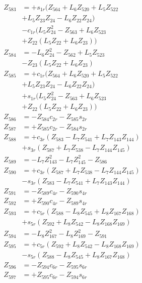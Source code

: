 \begin{multicols}{2}
\begin{align}
Z_{583} &= + s_{1r}(Z_{564} + L_6Z_{520} + L_5Z_{522}  \nonumber \\
&+ L_5Z_{23}Z_{24} - L_6Z_{22}Z_{24})  \nonumber \\
&- c_{1r}(L_5Z_{24}^2 - Z_{563} + L_6Z_{523}  \nonumber \\
&+ Z_{22}(L_5Z_{22} + L_6Z_{23})) \nonumber \\
Z_{584} &= - L_6Z_{24}^2 - Z_{562} + L_5Z_{523}  \nonumber \\
&- Z_{23}(L_5Z_{22} + L_6Z_{23})  \nonumber \\
Z_{585} &= + c_{1r}(Z_{564} + L_6Z_{520} + L_5Z_{522}  \nonumber \\
&+ L_5Z_{23}Z_{24} - L_6Z_{22}Z_{24})  \nonumber \\
&+ s_{1r}(L_5Z_{24}^2 - Z_{563} + L_6Z_{523}  \nonumber \\
&+ Z_{22}(L_5Z_{22} + L_6Z_{23})) \nonumber \\
Z_{586} &=  - Z_{584}c_{2r} - Z_{585}s_{2r} \nonumber \\
Z_{587} &=  + Z_{585}c_{2r} - Z_{584}s_{2r} \nonumber \\
Z_{588} &= + c_{3r}(Z_{583} - L_7Z_{541} + L_7Z_{143}Z_{144})  \nonumber \\
&+ s_{3r}(Z_{587} + L_7Z_{538} - L_7Z_{144}Z_{145}) \nonumber \\
Z_{589} &= - L_7Z_{143}^2 - L_7Z_{145}^2 - Z_{586}  \nonumber \\
Z_{590} &=  + c_{3r}(Z_{587} + L_7Z_{538} - L_7Z_{144}Z_{145})  \nonumber \\
&- s_{3r}(Z_{583} - L_7Z_{541} + L_7Z_{143}Z_{144}) \nonumber \\
Z_{591} &= - Z_{589}c_{4r} - Z_{590}s_{4r} \nonumber \\
Z_{592} &= + Z_{590}c_{4r} - Z_{589}s_{4r} \nonumber \\
Z_{593} &= + c_{5r}(Z_{588} - L_8Z_{545} + L_8Z_{167}Z_{168})  \nonumber \\
&+ s_{5r}(Z_{592} + L_8Z_{542} - L_8Z_{168}Z_{169}) \nonumber \\
Z_{594} &= - L_8Z_{167}^2 - L_8Z_{169}^2 - Z_{591}  \nonumber \\
Z_{595} &=  + c_{5r}(Z_{592} + L_8Z_{542} - L_8Z_{168}Z_{169})  \nonumber \\
&- s_{5r}(Z_{588} - L_8Z_{545} + L_8Z_{167}Z_{168}) \nonumber \\
Z_{596} &=  - Z_{594}c_{6r} - Z_{595}s_{6r} \nonumber \\
Z_{597} &=  + Z_{595}c_{6r} - Z_{594}s_{6r} \nonumber \\

\end{align}
\end{multicols}
